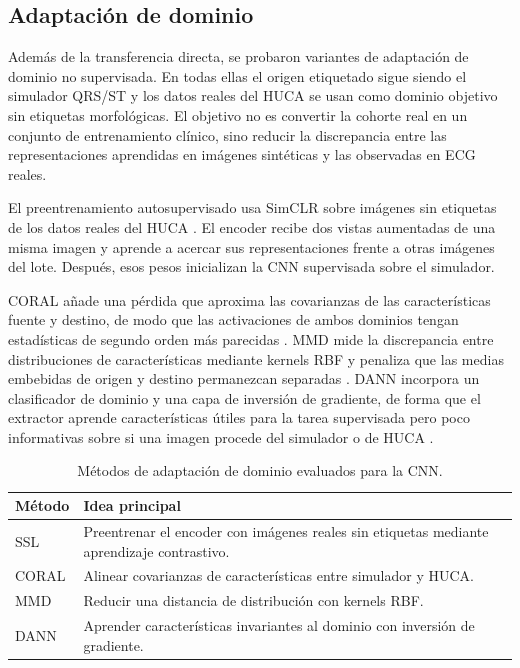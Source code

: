 \subsection{Adaptación de dominio}

Además de la transferencia directa, se probaron variantes de adaptación de dominio no supervisada. En todas ellas el origen etiquetado sigue siendo el simulador QRS/ST y los datos reales del HUCA se usan como dominio objetivo sin etiquetas morfológicas. El objetivo no es convertir la cohorte real en un conjunto de entrenamiento clínico, sino reducir la discrepancia entre las representaciones aprendidas en imágenes sintéticas y las observadas en ECG reales.

El preentrenamiento autosupervisado usa SimCLR sobre imágenes sin etiquetas de los datos reales del HUCA \cite{chen2020simclr}. El encoder recibe dos vistas aumentadas de una misma imagen y aprende a acercar sus representaciones frente a otras imágenes del lote. Después, esos pesos inicializan la CNN supervisada sobre el simulador.

CORAL añade una pérdida que aproxima las covarianzas de las características fuente y destino, de modo que las activaciones de ambos dominios tengan estadísticas de segundo orden más parecidas \cite{sun2016deepcoral}. MMD mide la discrepancia entre distribuciones de características mediante kernels RBF y penaliza que las medias embebidas de origen y destino permanezcan separadas \cite{long2015dan}. DANN incorpora un clasificador de dominio y una capa de inversión de gradiente, de forma que el extractor aprende características útiles para la tarea supervisada pero poco informativas sobre si una imagen procede del simulador o de HUCA \cite{ganin2016}.

\begin{table}[H]
  \centering
  \small
  \begin{tabularx}{0.94\textwidth}{p{2.6cm}X}
    \toprule
    Método & Idea principal \\
    \midrule
    SSL & Preentrenar el encoder con imágenes reales sin etiquetas mediante aprendizaje contrastivo. \\
    CORAL & Alinear covarianzas de características entre simulador y HUCA. \\
    MMD & Reducir una distancia de distribución con kernels RBF. \\
    DANN & Aprender características invariantes al dominio con inversión de gradiente. \\
    \bottomrule
  \end{tabularx}
  \caption{Métodos de adaptación de dominio evaluados para la CNN.}
  \label{tab:cnn_domain_methods}
\end{table}

